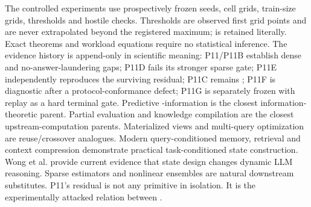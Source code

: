 \markdownRendererDocumentBegin
\markdownRendererSectionBegin
{}\markdownRendererInterblockSeparator
{}The controlled experiments use prospectively frozen seeds, cell grids, train-size grids, thresholds and hostile checks. Thresholds are observed first grid points and are never extrapolated beyond the registered maximum;  is retained literally. Exact theorems and workload equations require no statistical inference.\markdownRendererInterblockSeparator
{}The evidence history is append-only in scientific meaning: P11/P11B establish dense and no-answer-laundering gaps; P11D fails its stronger sparse gate; P11E independently reproduces the surviving residual; P11C remains ; P11F is diagnostic after a protocol-conformance defect; P11G is separately frozen with replay as a hard terminal gate.\markdownRendererInterblockSeparator
{}Predictive -information is the closest information-theoretic parent. Partial evaluation and knowledge compilation are the closest upstream-computation parents. Materialized views and multi-query optimization are reuse/crossover analogues. Modern query-conditioned memory, retrieval and context compression demonstrate practical task-conditioned state construction. Wong et al. provide current evidence that state design changes dynamic LLM reasoning. Sparse estimators and nonlinear ensembles are natural downstream substitutes.\markdownRendererInterblockSeparator
{}P11's residual is not any primitive in isolation. It is the experimentally attacked relation between .
\markdownRendererSectionEnd \markdownRendererDocumentEnd